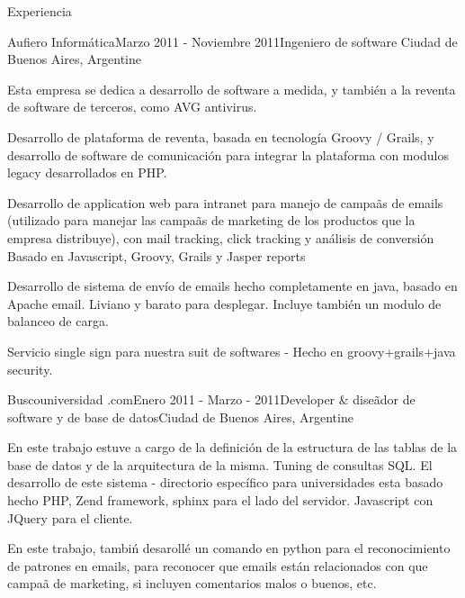 \documentclass{resume} %
\begin{document}
\begin{rSection}{Experiencia}
\begin{rSubsection}{Aufiero Inform\'atica}{Marzo 2011 - Noviembre 2011}{Ingeniero de software }{Ciudad de Buenos Aires, Argentine}
\item Esta empresa se dedica a desarrollo de software a medida, y tambi\'en a la reventa de software de terceros, como AVG antivirus. 
\item Desarrollo de plataforma de reventa, basada en tecnolog\'ia Groovy / Grails, y desarrollo de software de comunicaci\'on para integrar la plataforma con modulos legacy desarrollados en PHP.
\item Desarrollo de application web para intranet para manejo de campa\~as de emails (utilizado para manejar las campa\~as de marketing de los productos que la empresa distribuye), con mail tracking, click tracking y an\'alisis de conversi\'on Basado en Javascript, Groovy, Grails y Jasper reports
\item Desarrollo de sistema de env\'io de emails  hecho completamente en java, basado en Apache email. Liviano y barato para desplegar. Incluye tambi\'en  un modulo de balanceo de carga.
\item Servicio single sign para nuestra suit de softwares - Hecho en groovy+grails+java security.
\end{rSubsection}


\begin{rSubsection}{Buscouniversidad .com}{Enero 2011 -  Marzo - 2011}{Developer \& dise\~ador de software y de base de datos}{Ciudad de Buenos Aires, Argentine}
\item En este trabajo estuve a cargo de la definici\'on de la estructura de las tablas de la base de datos y de la arquitectura de la misma. Tuning de consultas SQL. El desarrollo de este sistema - directorio espec\'ifico para universidades esta basado hecho PHP, Zend framework, sphinx para el lado del servidor.  Javascript con JQuery para el cliente. 
\item En este trabajo, tambi\'n desaroll\'e un comando en python para el reconocimiento de patrones en emails, para reconocer que emails est\'an relacionados con que campa\~a de marketing, si incluyen comentarios malos o buenos, etc. 
\end{rSubsection}



\end{rSection}
\end{document}
